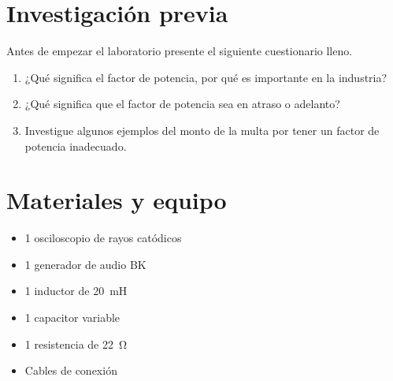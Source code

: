 \documentclass[12pt,letterpaper]{report}
\newcommand{\inv}{Investigación previa}
\newcommand{\mat}{Materiales y equipo}
\newcommand{\antesde}{Antes de empezar el laboratorio presente el siguiente cuestionario lleno.}
\begin{document}
\section{\inv}
\antesde
\begin{enumerate}
\item ¿Qué significa el factor de potencia, por qué es importante en la industria?
\item ¿Qué significa que el factor de potencia sea en atraso o adelanto?
\item Investigue algunos ejemplos del monto de la multa por tener un factor de potencia inadecuado.
\end{enumerate}
\section{\mat}
\begin{itemize}
\item 1 osciloscopio de rayos catódicos
\item 1 generador de audio BK
\item 1 inductor de \SI{20}{\milli\henry}
\item 1 capacitor variable
\item 1 resistencia de \SI{22}{\ohm}
\item Cables de conexión
\end{itemize}
\end{document}
